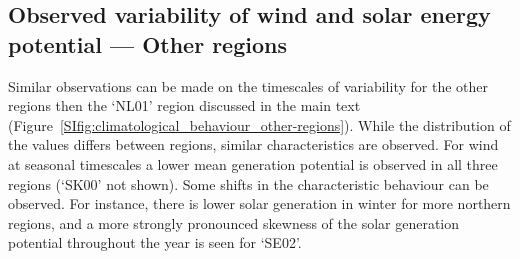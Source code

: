 \documentclass[a4paper,11pt]{extarticle}
\begin{document}
\subsection{Observed variability of wind and solar energy potential --- Other regions}
Similar observations can be made on the timescales of variability for the other regions then the `NL01' region discussed in the main text (Figure~\ref{SIfig:climatological_behaviour_other-regions}). 
While the distribution of the values differs between regions, similar characteristics are observed. 
For wind at seasonal timescales a lower mean generation potential is observed in all three regions (`SK00' not shown). 
Some shifts in the characteristic behaviour can be observed. 
For instance, there is lower solar generation in winter for more northern regions, and a more strongly pronounced skewness of the solar generation potential throughout the year is seen for `SE02'. 
\end{document}
